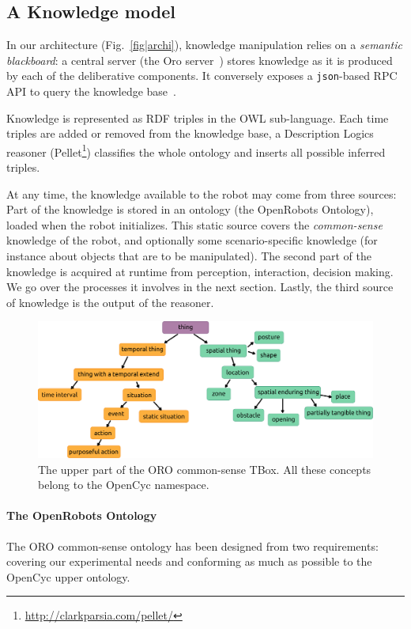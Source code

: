 \documentclass[preprint,5p]{elsarticle}
\begin{document}
\subsection{A Knowledge model}

In our architecture (Fig.~\ref{fig|archi}), knowledge manipulation relies on a
\emph{semantic blackboard}: a central server (the {\sc Oro}
server~\cite{Lemaignan2010}) stores knowledge as it is produced by each of the
deliberative components. It conversely exposes a {\tt json}-based RPC API to
query the knowledge base~\cite{lemaignan2012kbapi}.

Knowledge is represented as RDF triples in the OWL sub-language. Each
time triples are added or removed from the knowledge base, a Description
Logics reasoner ({\sc Pellet}\footnote{\url{http://clarkparsia.com/pellet/}})
classifies the whole ontology and inserts all possible inferred triples.

At any time, the knowledge available to the robot may come from three sources:
Part of the knowledge is stored in an ontology (the {\sc OpenRobots Ontology}),
loaded when the robot initializes. This static source covers the
\emph{common-sense} knowledge of the robot, and optionally some
scenario-specific knowledge (for instance about objects that are to be
manipulated). The second part of the knowledge is acquired at runtime from
perception, interaction, decision making.  We go over the processes it involves
in the next section. Lastly, the third source of knowledge is the output of the
reasoner.

\begin{figure}
    \centering
    \includegraphics[width=\columnwidth]{top_tbox.pdf}

    \caption{The upper part of the ORO common-sense TBox. All these concepts
    belong to the {\sc OpenCyc} namespace.}
    
    \label{fig|upper_tbox}
\end{figure}

\paragraph{The OpenRobots Ontology} The ORO common-sense ontology has been designed from two requirements: covering
our experimental needs and conforming as much as possible to the {\sc OpenCyc}
upper ontology.
\end{document}
